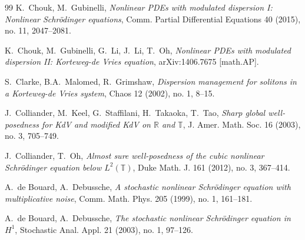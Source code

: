\documentclass[letterpaper, 11pt,  reqno]{amsart}
\newcommand{\1}{\hspace{0.5mm}\textup{I}\hspace{0.5mm}}
\newcommand{\R}{\mathbb{R}}
\newcommand{\T}{\mathbb{T}}
\numberwithin{equation}{section}
\numberwithin{theorem}{section}
\begin{document}
\begin{thebibliography}{99}
K.~Chouk, M.~Gubinelli, 
{\it Nonlinear PDEs with modulated dispersion I: Nonlinear Schr\"odinger equations},
Comm. Partial Differential Equations 40 (2015), no. 11, 2047--2081. 



K.~Chouk, M.~Gubinelli, G.~Li, J.~Li, T.~Oh, 
{\it Nonlinear PDEs with modulated dispersion II: Korteweg-de Vries equation}, 
arXiv:1406.7675 [math.AP].



S.~Clarke, B.A.~Malomed, R.~Grimshaw,
{\it Dispersion management for solitons in a Korteweg-de Vries system},
Chaos 12 (2002), no. 1, 8--15.






J.~Colliander, M.~Keel, G.~Staffilani, H.~Takaoka, T.~Tao,
{\it Sharp global well-posedness for KdV and modified KdV on $\R$ and $\T$},
J. Amer. Math. Soc. 16 (2003), no. 3, 705--749.


J.~Colliander, T.~Oh, 
{\it  Almost sure well-posedness of the cubic nonlinear Schr\"odinger equation below $L^2(\T)$}, 
Duke Math. J. 161 (2012), no. 3, 367--414. 


%

%
%
%
%
%


A.~de Bouard, A.~Debussche, 
{\it A stochastic nonlinear Schr\"odinger equation with multiplicative noise},
 Comm. Math. Phys. 205 (1999), no. 1, 161--181.


A.~de Bouard, A.~Debussche, 
{\it The stochastic nonlinear Schr\"odinger equation in $H^1$},
 Stochastic Anal. Appl. 21 (2003), no. 1, 97--126. 


\end{thebibliography}
\end{document}
